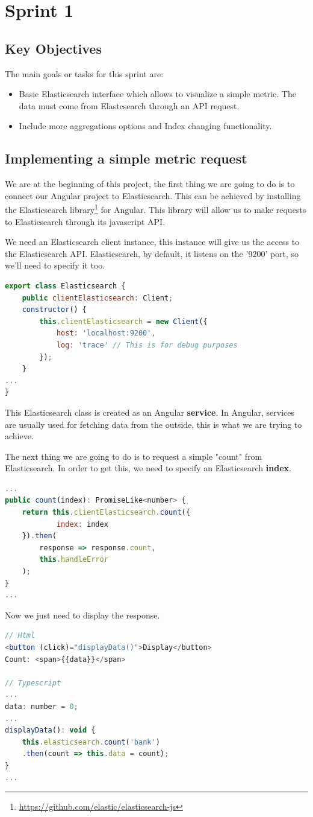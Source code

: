 \documentclass[a4paper, 12pt, english]{book}
\begin{document}
\section{Sprint 1}
\label{sec:sprint-1}

\subsection{Key Objectives}
\label{sec:key-objectives}

The main goals or tasks for this sprint are:
\begin{itemize}
    \item Basic Elasticsearch interface which allows to visualize a simple metric. The data must come from Elastcsearch through an API request.
    \item Include more aggregations options and Index changing functionality.
\end{itemize}

\subsection{Implementing a simple metric request}
\label{sec:simple-request}
We are at the beginning of this project, the first thing we are going to do is to connect our Angular project to Elasticsearch. This can be achieved by installing the Elasticsearch library\footnote{\url{https://github.com/elastic/elasticsearch-js}} for Angular. This library will allow us to make requests to Elasticsearch through its javascript API.

We need an Elasticsearch client instance, this instance will give us the access to the Elasticsearch API. Elasticsearch, by default, it listens on the '9200' port, so we'll need to specify it too.
\begin{lstlisting}[language=javascript, caption=Client Insance, label=code:client-instance]
export class Elasticsearch {
	public clientElasticsearch: Client;
	constructor() {
		this.clientElasticsearch = new Client({
			host: 'localhost:9200',
			log: 'trace' // This is for debug purposes
		});
	}
...
}
\end{lstlisting}
This Elasticsearch class is created as an Angular \textbf{service}. In Angular, services are usually used for fetching data from the outside, this is what we are trying to achieve.

The next thing we are going to do is to request a simple "count" from Elasticsearch. In order to get this, we need to specify an Elasticsearch \textbf{index}.
\begin{lstlisting}[language=javascript]
...
public count(index): PromiseLike<number> {
	return this.clientElasticsearch.count({
			index: index
	}).then(
		response => response.count,
		this.handleError
	);
}
...
\end{lstlisting}
Now we just need to display the response.
\begin{lstlisting}[language=javascript]
// Html
<button (click)="displayData()">Display</button>
Count: <span>{{data}}</span>

// Typescript
...
data: number = 0;
...
displayData(): void {
	this.elasticsearch.count('bank')
	.then(count => this.data = count);
}
...
\end{lstlisting}
\end{document}
